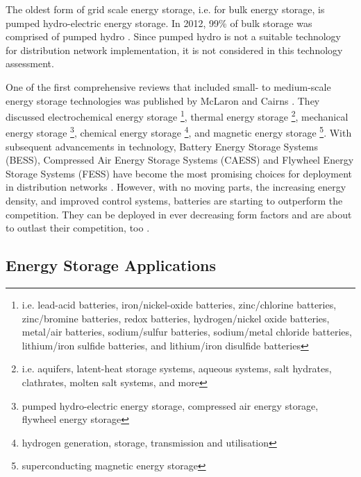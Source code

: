 The oldest form of grid scale energy storage, i.e. for bulk energy storage, is pumped hydro-electric energy storage.
In 2012, 99\% of bulk storage was comprised of pumped hydro \cite{TheEconomist2012a}.
Since pumped hydro is not a suitable technology for distribution network implementation, it is not considered in this technology assessment.

One of the first comprehensive reviews that included small- to medium-scale energy storage technologies was published by McLaron and Cairns \cite{McLarnon1989}.
They discussed
electrochemical energy storage \footnote{i.e. lead-acid batteries, iron/nickel-oxide batteries, zinc/chlorine batteries, zinc/bromine batteries, redox batteries, hydrogen/nickel oxide batteries, metal/air batteries, sodium/sulfur batteries, sodium/metal chloride batteries, lithium/iron sulfide batteries, and lithium/iron disulfide batteries},
thermal energy storage \footnote{i.e. aquifers, latent-heat storage systems, aqueous systems, salt hydrates, clathrates, molten salt systems, and more},
mechanical energy storage \footnote{pumped hydro-electric energy storage, compressed air energy storage, flywheel energy storage},
chemical energy storage \footnote{hydrogen generation, storage, transmission and utilisation},
and magnetic energy storage \footnote{superconducting magnetic energy storage}.
With subsequent advancements in technology, Battery Energy Storage Systems (BESS), Compressed Air Energy Storage Systems (CAESS) and Flywheel Energy Storage Systems (FESS) have become the most promising choices for deployment in distribution networks \cite{Ibrahim2008, Chen2009, Hadjipaschalis2009}.
However, with no moving parts, the increasing energy density, and improved control systems, batteries are starting to outperform the competition.
They can be deployed in ever decreasing form factors and are about to outlast their competition, too \cite{Luo2015}.

\subsection{Energy Storage Applications}

